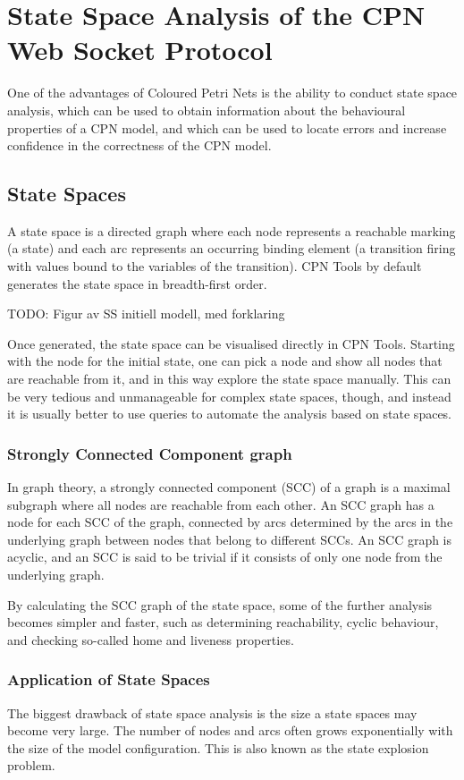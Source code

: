 \chapter{State Space Analysis of the CPN Web Socket Protocol}
\label{chap:statespace}

One of the advantages of Coloured Petri Nets is the ability to conduct state
space analysis, which can be used to obtain information about the
behavioural properties of a CPN model, and which can be used to locate errors
and increase confidence in the correctness of the CPN model.

\section{State Spaces}
A state space is a directed graph where each node represents a reachable marking
(a state) and each arc represents an occurring binding element (a transition
firing with values bound to the variables of the transition). CPN Tools
by default generates the state space in breadth-first order. 

TODO: Figur av SS initiell modell, med forklaring

Once generated, the state space can be visualised directly in CPN Tools.
Starting with the node for the initial state, one can pick a node and show all
nodes that are reachable from it, and in this way explore the state space
manually. This can be very tedious and unmanageable for complex state spaces,
though, and instead it is usually better to use queries to automate the analysis
based on state spaces.

	\subsection{Strongly Connected Component graph}
	In graph theory, a strongly connected component (SCC) of a graph is a maximal
	subgraph where all nodes are reachable from each other. An SCC graph has a node
	for each SCC of the graph, connected by arcs determined by the arcs in the
	underlying graph between nodes that belong to different SCCs. An
	SCC graph is acyclic, and an SCC is said to be trivial if it consists of only
	one node from the underlying graph.
	
	By calculating the SCC graph of the state space, some of the further
	analysis becomes simpler and faster, such as determining reachability,
	cyclic behaviour, and checking so-called home and liveness properties. 

	\subsection{Application of State Spaces}
		The biggest drawback of state space analysis is the size a state spaces may
		become very large. The number of nodes and arcs often grows exponentially
		with the size of the model configuration.
		This is also known as the state explosion problem.
		

